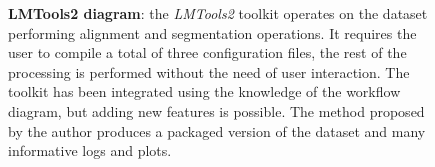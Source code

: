 \begin{figure}[htbp]
	\centering
	\caption[LMTools2 diagram]{\textbf{LMTools2 diagram}: the \emph{LMTools2}
	toolkit operates on the dataset performing alignment and segmentation
	operations. It requires the user to compile a total of three configuration
	files, the rest of the processing is performed without the need of user
	interaction. The toolkit has been integrated using the knowledge of the
	workflow diagram, but adding new features is possible.
	The method proposed by the author produces a packaged version of the
	dataset and many informative logs and plots.}
	\label{fig:results:blackbox}
\end{figure}
